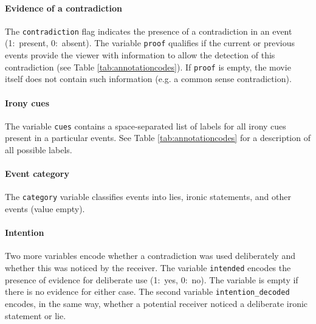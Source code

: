 \documentclass[10pt,a4paper]{article}
\begin{document}
\paragraph{Evidence of a contradiction}

The \texttt{contradiction} flag indicates the presence of a contradiction
in an event (1:~present, 0:~absent). The variable \texttt{proof} qualifies
if the current or previous events provide the viewer with information to allow
the detection of this contradiction (see Table
\ref{tab:annotationcodes}). If \texttt{proof} is empty, the movie itself does
not contain such information (e.g. a common sense contradiction).

\paragraph{Irony cues} The variable \texttt{cues} contains a space-separated
list of labels for all irony cues present in a particular events. See Table
\ref{tab:annotationcodes} for a description of all possible labels.

\paragraph{Event category} The \texttt{category} variable classifies events
into lies, ironic statements, and other events (value empty).

\paragraph{Intention} Two more variables encode whether a contradiction was used
deliberately and whether this was noticed by the receiver. The variable
\texttt{intended} encodes the presence of evidence for deliberate use (1:~yes,
0:~no). The variable is empty if there is no evidence for either case. The
second variable \texttt{intention\_decoded} encodes, in the same way, whether a
potential receiver noticed a deliberate ironic statement or lie.
\end{document}
